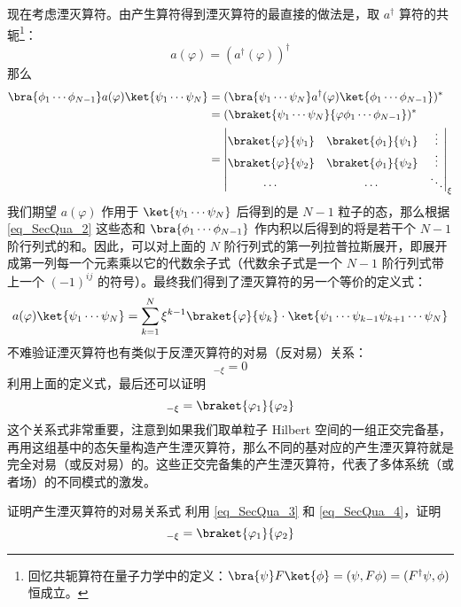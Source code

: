 现在考虑湮灭算符。由产生算符得到湮灭算符的最直接的做法是，取 $a^\dagger$ 算符的共轭\footnote{回忆共轭算符在量子力学中的定义：$\bra{\psi}F\ket{\phi}=(\psi,F \phi)=(F^\dagger \psi,\phi)$ 恒成立。}：
\begin{equation}\label{eq_SecQua_7}
a(\varphi)=(a^\dagger(\varphi))^\dagger
\end{equation}
那么
\begin{equation}\label{eq_SecQua_4}
\begin{aligned}
\bra{\phi_1\cdots\phi_{N-1}} a(\varphi) \ket{\psi_1\cdots\psi_{N}}&=(\bra{\psi_1\cdots\psi_{N}}a^\dagger(\varphi)\ket{\phi_1\cdots\phi_{N-1}})^*\\
&=(\braket{\psi_1\cdots\psi_{N}}{\varphi\phi_1\cdots\phi_{N-1}})^*\\
&=\left|
\begin{matrix}
\braket{\varphi}{\psi_1} & \braket{\phi_1}{\psi_1} & \vdots\\
\braket{\varphi}{\psi_2} & \braket{\phi_1}{\psi_2} & \vdots\\
\cdots & \cdots & \ddots
\end{matrix}
\right|_{\xi}
\end{aligned}
\end{equation}
我们期望 $a(\varphi)$ 作用于 $\ket{\psi_1\cdots\psi_N}$ 后得到的是 $N-1$ 粒子的态，那么根据\autoref{eq_SecQua_2} 这些态和 $\bra{\phi_1\cdots\phi_{N-1}}$ 作内积以后得到的将是若干个 $N-1$ 阶行列式的和。因此，可以对上面的 $N$ 阶行列式的第一列拉普拉斯展开，即展开成第一列每一个元素乘以它的代数余子式（代数余子式是一个 $N-1$ 阶行列式带上一个 $(-1)^{ij}$ 的符号）。最终我们得到了湮灭算符的另一个等价的定义式：
\begin{equation}\label{eq_SecQua_5}
a(\varphi)\ket{\psi_1\cdots\psi_N}=\sum_{k=1}^N \xi^{k-1} \braket{\varphi}{\psi_k} \cdot\ket{\psi_1\cdots\psi_{k-1}\psi_{k+1}\cdots \psi_N}
\end{equation}
不难验证湮灭算符也有类似于反湮灭算符的对易（反对易）关系：
\begin{equation}
[a(\varphi_1),a(\varphi_2)]_{-\xi}=0
\end{equation}
利用上面的定义式，最后还可以证明
\begin{equation}
[a(\varphi_1),a^\dagger(\varphi_2)]_{-\xi}=\braket{\varphi_1}{\varphi_2}
\end{equation}
这个关系式非常重要，注意到如果我们取单粒子 Hilbert 空间的一组正交完备基，再用这组基中的态矢量构造产生湮灭算符，那么不同的基对应的产生湮灭算符就是完全对易（或反对易）的。这些正交完备集的产生湮灭算符，代表了多体系统（或者场）的不同模式的激发。
\begin{exercise}{证明产生湮灭算符的对易关系式}
利用 \autoref{eq_SecQua_3} 和 \autoref{eq_SecQua_4}，证明
\begin{equation}
[a(\varphi_1),a^\dagger(\varphi_2)]_{-\xi}=\braket{\varphi_1}{\varphi_2}
\end{equation}
\end{exercise}
